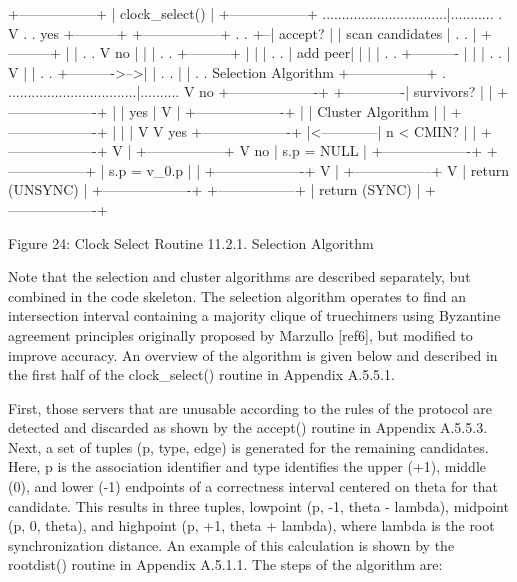                           +-----------------+
                          | clock_select()  |
                          +-----------------+
   ................................|...........
   .                               V          .
   .      yes +---------+ +-----------------+ .
   .       +--| accept? | | scan candidates | .
   .       |  +---------+ |                 | .
   .       V        no |  |                 | .
   .  +---------+      |  |                 | .
   .  | add peer|      |  |                 | .
   .  +----------      |  |                 | .
   .       |           V  |                 | .
   .       +---------->-->|                 | .
   .                      |                 | .
   . Selection Algorithm  +-----------------+ .
   .................................|..........
                                    V
                       no +-------------------+
            +-------------|     survivors?    |
            |             +-------------------+
            |                       | yes
            |                       V
            |             +-------------------+
            |             | Cluster Algorithm |
            |             +-------------------+
            |                       |
            |                       V
            V         yes +-------------------+
            |<------------|     n < CMIN?     |
            |             +-------------------+
            V                       |
     +-----------------+            V no
     |   s.p = NULL    |  +-------------------+
     +-----------------+  |   s.p = v_0.p     |
            |             +-------------------+
            V                       |
     +-----------------+            V
     | return (UNSYNC) |  +-------------------+
     +-----------------+  |   return (SYNC)   |
                          +-------------------+

                      Figure 24: Clock Select Routine
11.2.1.  Selection Algorithm

   Note that the selection and cluster algorithms are described
   separately, but combined in the code skeleton.  The selection
   algorithm operates to find an intersection interval containing a
   majority clique of truechimers using Byzantine agreement principles
   originally proposed by Marzullo [ref6], but modified to improve
   accuracy.  An overview of the algorithm is given below and described
   in the first half of the clock_select() routine in Appendix A.5.5.1.

   First, those servers that are unusable according to the rules of the
   protocol are detected and discarded as shown by the accept() routine
   in Appendix A.5.5.3.  Next, a set of tuples (p, type, edge) is
   generated for the remaining candidates.  Here, p is the association
   identifier and type identifies the upper (+1), middle (0), and lower
   (-1) endpoints of a correctness interval centered on theta for that
   candidate.  This results in three tuples, lowpoint (p, -1, theta -
   lambda), midpoint (p, 0, theta), and highpoint (p, +1, theta +
   lambda), where lambda is the root synchronization distance.  An
   example of this calculation is shown by the rootdist() routine in
   Appendix A.5.1.1.  The steps of the algorithm are:


